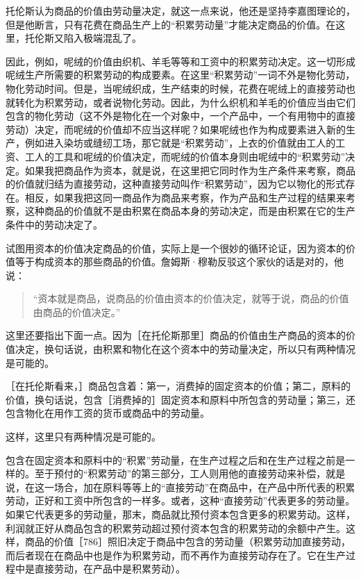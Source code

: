 托伦斯认为商品的价值由劳动量决定，就这一点来说，他还是坚持李嘉图理论的，但是他断言，只有花费在商品生产上的“积累劳动量”才能决定商品的价值。在这里，托伦斯又陷入极端混乱了。

因此，例如，呢绒的价值由织机、羊毛等等和工资中的积累劳动决定。这一切形成呢绒生产所需要的积累劳动的构成要素。在这里“积累劳动”一词不外是物化劳动，物化劳动时间。但是，当呢绒织成，生产结束的时候，花费在呢绒上的直接劳动也就转化为积累劳动，或者说物化劳动。因此，为什么织机和羊毛的价值应当由它们包含的物化劳动（这不外是物化在一个对象中，一个产品中，一个有用物中的直接劳动）决定，而呢绒的价值却不应当这样呢？如果呢绒也作为构成要素进入新的生产，例如进入染坊或缝纫工场，那它就是“积累劳动”，上衣的价值就由工人的工资、工人的工具和呢绒的价值决定，而呢绒的价值本身则由呢绒中的“积累劳动”决定。如果我把商品作为资本，就是说，在这里把它同时作为生产条件来考察，商品的价值就归结为直接劳动，这种直接劳动叫作“积累劳动”，因为它以物化的形式存在。相反，如果我把这同一商品作为商品来考察，作为产品和生产过程的结果来考察，这种商品的价值就不是由积累在商品本身的劳动决定，而是由积累在它的生产条件中的劳动决定了。

试图用资本的价值决定商品的价值，实际上是一个很妙的循环论证，因为资本的价值等于构成资本的那些商品的价值。詹姆斯·穆勒反驳这个家伙的话是对的，他说：

\begin{quote}{“资本就是商品，说商品的价值由资本的价值决定，就等于说，商品的价值由商品的价值决定。”}\end{quote}

这里还要指出下面一点。因为［在托伦斯那里］商品的价值由生产商品的资本的价值决定，换句话说，由积累和物化在这个资本中的劳动量决定，所以只有两种情况是可能的。

［在托伦斯看来，］商品包含着：第一，消费掉的固定资本的价值；第二，原料的价值，换句话说，包含［消费掉的］固定资本和原料中所包含的劳动量；第三，还包含物化在用作工资的货币或商品中的劳动量。

这样，这里只有两种情况是可能的。

包含在固定资本和原料中的“积累”劳动量，在生产过程之后和在生产过程之前是一样的。至于预付的“积累劳动”的第三部分，工人则用他的直接劳动来补偿，就是说，在这一场合，加在原料等等上的“直接劳动”在商品中，在产品中所代表的积累劳动，正好和工资中所包含的一样多。或者，这种“直接劳动”代表更多的劳动量。如果它代表更多的劳动量，那末，商品就比预付资本包含更多的积累劳动。这样，利润就正好从商品包含的积累劳动超过预付资本包含的积累劳动的余额中产生。这样，商品的价值［786］照旧决定于商品中包含的劳动量（积累劳动加直接劳动，而后者现在在商品中也是作为积累劳动，而不再作为直接劳动存在了。它在生产过程中是直接劳动，在产品中是积累劳动）。

